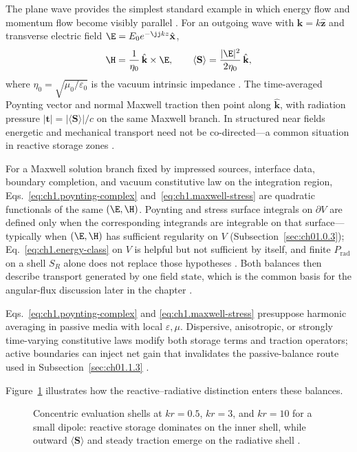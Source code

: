 \label{eq:ch1.energy-momentum-directional-ratio}
The plane wave provides the simplest standard example in which energy flow and momentum flow become visibly parallel \cite{poynting1884,stratton1941}. For an outgoing wave with $\mathbf{k}=k\hat{\mathbf{z}}$ and transverse electric field $\E=E_0 e^{-\jj k z}\hat{\mathbf{x}}$,
\begin{equation}
\label{eq:ch1.plane-wave-transverse}
\H=\frac{1}{\eta_0}\,\hat{\mathbf{k}}\times\E,
\qquad
\langle\mathbf{S}\rangle=\frac{|\E|^{2}}{2\eta_0}\,\hat{\mathbf{k}},
\end{equation}
where $\eta_0=\sqrt{\mu_0/\varepsilon_0}$ is the vacuum intrinsic impedance \cite{stratton1941}. The time-averaged Poynting vector and normal Maxwell traction then point along $\hat{\mathbf{k}}$, with radiation pressure $|\mathbf{t}|=|\langle\mathbf{S}\rangle|/c$ on the same Maxwell branch. In structured near fields energetic and mechanical transport need not be co-directed---a common situation in reactive storage zones \cite{stratton1941}.

\label{prop:ch1.energy-momentum-consistency}
For a Maxwell solution branch fixed by impressed sources, interface data, boundary completion, and vacuum constitutive law on the integration region, Eqs.~\eqref{eq:ch1.poynting-complex} and~\eqref{eq:ch1.maxwell-stress} are quadratic functionals of the same \((\E,\H)\). Poynting and stress surface integrals on \(\partial V\) are defined only when the corresponding integrands are integrable on that surface---typically when \((\E,\H)\) has sufficient regularity on \(V\) (Subsection~\ref{sec:ch01.0.3}); Eq.~\eqref{eq:ch1.energy-class} on \(V\) is helpful but not sufficient by itself, and finite \(P_{\mathrm{rad}}\) on a shell \(S_R\) alone does not replace those hypotheses \cite{stratton1941}. Both balances then describe transport generated by one field state, which is the common basis for the angular-flux discussion later in the chapter \cite{stratton1941}.

Eqs.~\eqref{eq:ch1.poynting-complex} and
\eqref{eq:ch1.maxwell-stress} presuppose harmonic averaging in passive media with
local \(\varepsilon,\mu\). Dispersive, anisotropic, or strongly time-varying
constitutive laws modify both storage terms and traction operators; active boundaries
can inject net gain that invalidates the passive-balance route used in
Subsection~\ref{sec:ch01.1.3}
\cite{stratton1941}.



Figure~\ref{fig:ch1.wp-reactive-vs-radiative} illustrates how the reactive--radiative distinction enters these balances.
\begin{figure}[!htbp]
\centering
\VolIPhysFig{\VolIPhysReactiveVsRadiative}
\caption{Concentric evaluation shells at $kr=0.5$, $kr=3$, and $kr=10$ for a small dipole: reactive storage dominates on the inner shell, while outward $\langle\mathbf{S}\rangle$ and steady traction emerge on the radiative shell \cite{stratton1941,chu1948}.}
\label{fig:ch1.wp-reactive-vs-radiative}
\end{figure}

